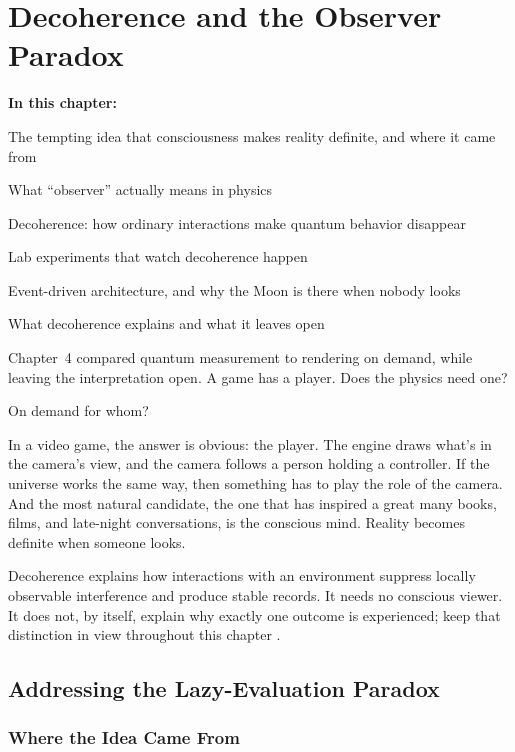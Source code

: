 \chapter{Decoherence and the Observer Paradox}

\begin{chaptermapbox}
\textbf{In this chapter:}
\begin{compactchecklist}
\item The tempting idea that consciousness makes reality definite, and where it came from
\item What ``observer'' actually means in physics
\item Decoherence: how ordinary interactions make quantum behavior disappear
\item Lab experiments that watch decoherence happen
\item Event-driven architecture, and why the Moon is there when nobody looks
\item What decoherence explains and what it leaves open
\end{compactchecklist}
\end{chaptermapbox}

Chapter~4 compared quantum measurement to rendering on demand, while leaving the interpretation open. A game has a player. Does the physics need one?

On demand for whom?

In a video game, the answer is obvious: the player. The engine draws what's in the camera's view, and the camera follows a person holding a controller. If the universe works the same way, then something has to play the role of the camera. And the most natural candidate, the one that has inspired a great many books, films, and late-night conversations, is the conscious mind. Reality becomes definite when someone looks.

Decoherence explains how interactions with an environment suppress locally observable interference and produce stable records. It needs no conscious viewer. It does not, by itself, explain why exactly one outcome is experienced; keep that distinction in view throughout this chapter \cite{schlosshauer2004decoherence}.

\section{Addressing the Lazy-Evaluation Paradox}

\subsection{Where the Idea Came From}

